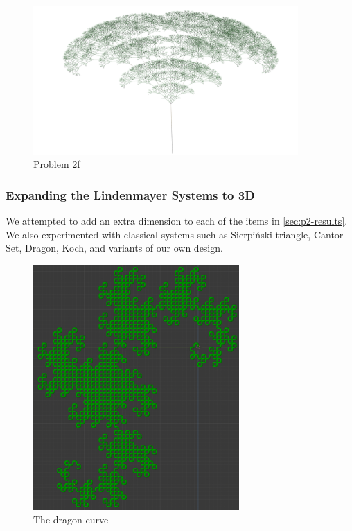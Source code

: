 \begin{figure}[H]
    \centering
    \includegraphics[width=0.90\textwidth]{figures/L-systems/f.png}
    \caption{Problem 2f}\label{fig:prob2f}
\end{figure}

\subsubsection{Expanding the Lindenmayer Systems to 3D}
We attempted to add an extra dimension to each of the items in \autoref{sec:p2-results}.
We also experimented with classical systems such as
Sierpiński triangle, Cantor Set, Dragon, Koch, and variants of our own design.

\begin{figure}[h]
    \centering
    \includegraphics[width=0.7\textwidth]{figures/L-systems/dragon.png}
    \caption{The dragon curve}
\end{figure}

